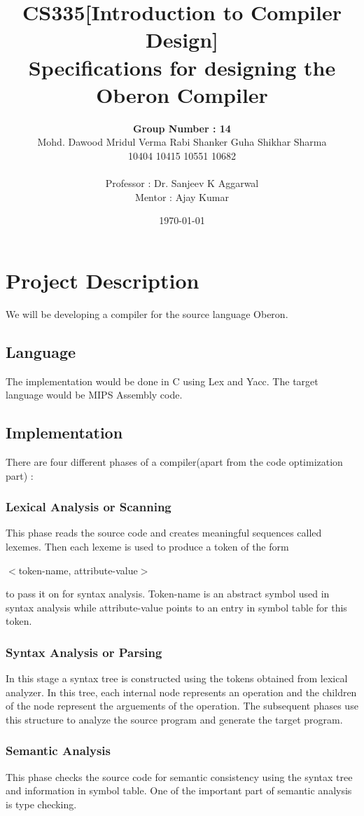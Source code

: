 \documentclass{article}
\title{ CS335[Introduction to Compiler Design]\\Specifications for designing the Oberon Compiler\vspace{0.25 in}}
\author{{\Large{\bf Group Number : 14}}\\Mohd. Dawood \hspace{0.5cm} Mridul Verma  \hspace{0.5cm}Rabi Shanker Guha   \hspace{0.5cm}Shikhar Sharma \\10404  \hspace{2.5cm}10415 \hspace{2.5cm}10551  \hspace{2.5cm}10682\\
	\\
	Professor : Dr. Sanjeev K Aggarwal\\Mentor : Ajay Kumar  }
\date{\today}
\begin{document}
\large
\maketitle
\vspace{-1.5cm}
\tableofcontents
\newpage
\section{Project Description}
We will be developing a compiler for the source language Oberon.
\subsection{Language}
The implementation would be done in C using Lex and Yacc. The target language would be MIPS Assembly code.
\subsection{Implementation}
There are four different phases of a compiler(apart from the code optimization part) : 
\subsubsection{Lexical Analysis or Scanning}
This phase reads the source code and creates meaningful sequences called lexemes. Then each lexeme is used to produce a token of the form
\begin{center}
$<$token-name, attribute-value$>$
\end{center}
to pass it on for syntax analysis. Token-name is an abstract symbol used in syntax analysis while attribute-value points to an entry in symbol table for this token.
\subsubsection{Syntax Analysis or Parsing}
In this stage a syntax tree is constructed using the tokens obtained from lexical analyzer. In this tree, each internal node represents an operation and the children of the node represent the arguements of the operation. The subsequent phases use this structure to analyze the source program and generate the target program.
\subsubsection{Semantic Analysis}
This phase checks the source code for semantic consistency using the syntax tree and information in symbol table. One of the important part of semantic analysis is type checking.
\end{document}
